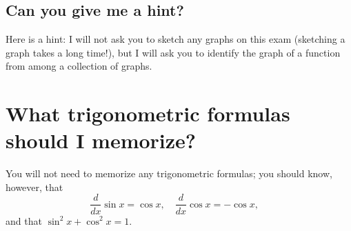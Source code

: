 \documentclass[12pt]{article}
\begin{document}
\subsection*{Can you give me a hint?}

Here is a hint: I will not ask you to sketch any graphs on this
exam (sketching a graph takes a long time!), but I will ask you to
identify the graph of a function from among a collection of graphs.

\section*{What trigonometric formulas should I memorize?}

You will not need to memorize any trigonometric formulas; you should know, however, that
$$
\frac{d}{dx} \sin x = \cos x, \hspace{1em} 
\frac{d}{dx} \cos x = -\cos x, \hspace{1em} 
$$
and that $\sin^2 x + \cos^2 x = 1$.
\end{document}

